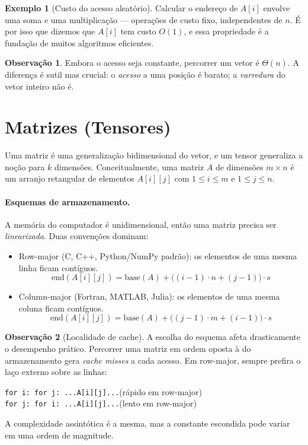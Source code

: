 \documentclass[9pt,a4paper]{extarticle}
\newcommand{\impt}[1]{\textcolor{important}{#1}}
\newcommand{\ntc}[1]{\textcolor{notice}{#1}}
\theoremstyle{definition}
\newtheorem{example}{Exemplo}[section]
\newtheorem{remark}{Observação}[section]
\begin{document}
\begin{example}[Custo do acesso aleatório]
Calcular o endereço de $A[i]$ envolve uma soma e uma multiplicação — operações de custo fixo, independentes de $n$. É por isso que dizemos que $A[i]$ tem custo $O(1)$, e essa propriedade é a fundação de muitos algoritmos eficientes.
\end{example}

\begin{remark}
Embora o acesso seja constante, \ntc{percorrer} um vetor é $\Theta(n)$. A diferença é sutil mas crucial: o \emph{acesso} a uma posição é barato; a \emph{varredura} do vetor inteiro não é.
\end{remark}

\section{Matrizes (Tensores)}

Uma \impt{matriz} é uma generalização bidimensional do vetor, e um \impt{tensor} generaliza a noção para $k$ dimensões. Conceitualmente, uma matriz $A$ de dimensões $m \times n$ é um arranjo retangular de elementos $A[i][j]$ com $1 \leq i \leq m$ e $1 \leq j \leq n$.

\paragraph{Esquemas de armazenamento.} A memória do computador é unidimensional, então uma matriz precisa ser \emph{linearizada}. Duas convenções dominam:

\begin{itemize}
    \item \impt{Row-major} (C, C++, Python/NumPy padrão): os elementos de uma mesma linha ficam contíguos.
    \[
    \mathrm{end}(A[i][j]) = \mathrm{base}(A) + \big( (i-1) \cdot n + (j-1) \big) \cdot s
    \]
    \item \impt{Column-major} (Fortran, MATLAB, Julia): os elementos de uma mesma coluna ficam contíguos.
    \[
    \mathrm{end}(A[i][j]) = \mathrm{base}(A) + \big( (j-1) \cdot m + (i-1) \big) \cdot s
    \]
\end{itemize}

\begin{remark}[Localidade de cache]
A escolha do esquema afeta \ntc{drasticamente} o desempenho prático. Percorrer uma matriz em ordem oposta à do armazenamento gera \emph{cache misses} a cada acesso. Em row-major, sempre prefira o laço externo sobre as linhas:
\begin{center}
\texttt{for i: for j: ...A[i][j]...}\quad (rápido em row-major)\\
\texttt{for j: for i: ...A[i][j]...}\quad (lento em row-major)
\end{center}
A complexidade assintótica é a mesma, mas a constante escondida pode variar em uma ordem de magnitude.
\end{remark}
\end{document}
